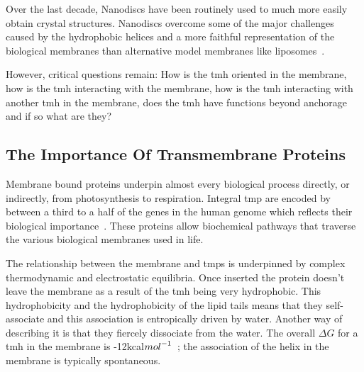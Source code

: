 
 Over the last decade, Nanodiscs have been routinely used to much more easily obtain crystal structures.
Nanodiscs overcome some of the major challenges caused by the hydrophobic helices and a more faithful representation of the biological membranes than alternative model membranes like liposomes~\cite{Borch2009}.

 However, critical questions remain: How is the \gls{tmh} oriented in the membrane, how is the \gls{tmh} interacting with the membrane, how is the \gls{tmh} interacting with another \gls{tmh} in the membrane, does the \gls{tmh} have functions beyond anchorage and if so what are they?




\subsection{The Importance Of Transmembrane Proteins}
Membrane bound proteins underpin almost every biological process directly, or indirectly, from photosynthesis to respiration.
Integral \gls{tmp} are encoded by between a third to a half of the genes in the human genome which reflects their biological importance~\cite{Hopkins2002, Almen2009, Wang2013}.
These proteins allow biochemical pathways that traverse the various biological membranes used in life.

The relationship between the membrane and \gls{tmp}s is underpinned by complex thermodynamic and electrostatic equilibria.
Once inserted the protein doesn't leave the membrane as a result of the \gls{tmh} being very hydrophobic.
This hydrophobicity and the hydrophobicity of the lipid tails means that they self-associate and this association is entropically driven by water.
Another way of describing it is that they fiercely dissociate from the water.
The overall $\Delta G$ for a \gls{tmh} in the membrane is -12kcal${mol}^{\--1}$~\cite{Cymer2015}; the association of the helix in the membrane is typically spontaneous.

